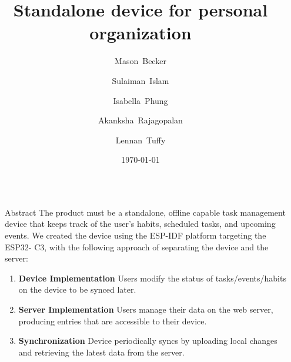 \documentclass[final]{beamer}
\title{Standalone device for personal organization}
\author{
  Mason~Becker
  \and
  Sulaiman~Islam
  \and
  Isabella~Phung
  \and
  Akanksha~Rajagopalan
  \and
  Lennan~Tuffy
}
\institute[UC Santa Cruz]{CSE 123 - Supervised by Prof. David Harrison}
\date{\today}
\newlength{\sepwidth}
\newlength{\colwidth}
\newcommand{\separatorcolumn}{\begin{column}{\sepwidth}\end{column}}
\begin{document}
\begin{frame}[t]
  \begin{columns}[t]
    \separatorcolumn

    \begin{column}{\colwidth}

      \begin{block}{Abstract}
        The product must be a standalone, offline capable task management device 
        that keeps track of the user's habits, scheduled tasks, and upcoming 
        events.
        We created the device using the ESP-IDF platform targeting the ESP32-
        C3, with the following approach of separating the device and the 
        server:

        \begin{enumerate}
          \item \textbf{Device Implementation} Users modify the status of 
            tasks/events/habits on the device to be synced later.
          \item \textbf{Server Implementation} Users manage their data on the
            web server, producing entries that are accessible to their device.
          \item \textbf{Synchronization} Device periodically syncs by uploading
            local changes and retrieving the latest data from the server. 
        \end{enumerate}

      \end{block}


\end{column}
\end{columns}
\end{frame}
\end{document}
